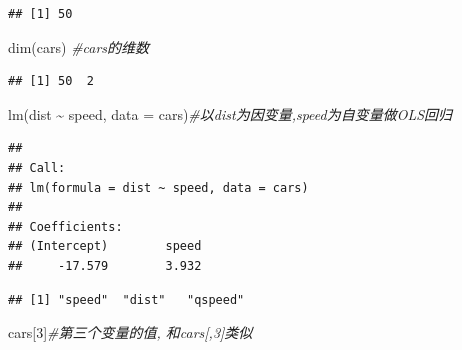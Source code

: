 \documentclass[
]{book}
\newenvironment{Shaded}{\begin{snugshade}}{\end{snugshade}}
\newcommand{\AttributeTok}[1]{\textcolor[rgb]{0.77,0.63,0.00}{#1}}
\newcommand{\CommentTok}[1]{\textcolor[rgb]{0.56,0.35,0.01}{\textit{#1}}}
\newcommand{\ConstantTok}[1]{\textcolor[rgb]{0.00,0.00,0.00}{#1}}
\newcommand{\DecValTok}[1]{\textcolor[rgb]{0.00,0.00,0.81}{#1}}
\newcommand{\FunctionTok}[1]{\textcolor[rgb]{0.00,0.00,0.00}{#1}}
\newcommand{\NormalTok}[1]{#1}
\newcommand{\OtherTok}[1]{\textcolor[rgb]{0.56,0.35,0.01}{#1}}
\newcommand{\SpecialCharTok}[1]{\textcolor[rgb]{0.00,0.00,0.00}{#1}}
\begin{document}
\begin{verbatim}
## [1] 50
\end{verbatim}

\begin{Shaded}
\begin{Highlighting}[]
\FunctionTok{dim}\NormalTok{(cars) }\CommentTok{\#cars的维数}
\end{Highlighting}
\end{Shaded}

\begin{verbatim}
## [1] 50  2
\end{verbatim}

\begin{Shaded}
\begin{Highlighting}[]
\FunctionTok{lm}\NormalTok{(dist }\SpecialCharTok{\textasciitilde{}}\NormalTok{ speed, }\AttributeTok{data =}\NormalTok{ cars)}\CommentTok{\#以dist为因变量,speed为自变量做OLS回归}
\end{Highlighting}
\end{Shaded}

\begin{verbatim}
## 
## Call:
## lm(formula = dist ~ speed, data = cars)
## 
## Coefficients:
## (Intercept)        speed  
##     -17.579        3.932
\end{verbatim}

\begin{Shaded}
\end{Shaded}

\begin{verbatim}
## [1] "speed"  "dist"   "qspeed"
\end{verbatim}

\begin{Shaded}
\begin{Highlighting}[]
\NormalTok{cars[}\DecValTok{3}\NormalTok{]}\CommentTok{\#第三个变量的值, 和cars[,3]类似}
\end{Highlighting}
\end{Shaded}
\end{document}
